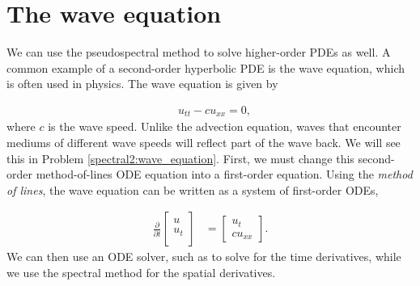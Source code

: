 \section*{The wave equation}
We can use the pseudospectral method to solve higher-order PDEs as well. A common example of a second-order hyperbolic PDE is the wave equation, which is often used in physics. The wave equation is given by

\begin{align*}
&{ }u_{tt} - cu_{xx} = 0,
\end{align*}
where $c$ is the wave speed. Unlike the advection equation, waves that encounter mediums of different wave speeds will reflect part of the wave back. We will see this in Problem \ref{spectral2:wave_equation}. First, we must change this second-order method-of-lines ODE equation into a first-order equation.
Using the \textit{method of lines}, the wave equation can be written as a system of first-order ODEs,

\begin{align}
\frac{\partial}{\partial t} \begin{bmatrix}
u\\
u_t \\
\end{bmatrix} &= 
\begin{bmatrix}
u_t\\
cu_{xx}
\end{bmatrix}.
\end{align}
We can then use an ODE solver, such as  to solve for the time derivatives, while we use the spectral method for the spatial derivatives.

